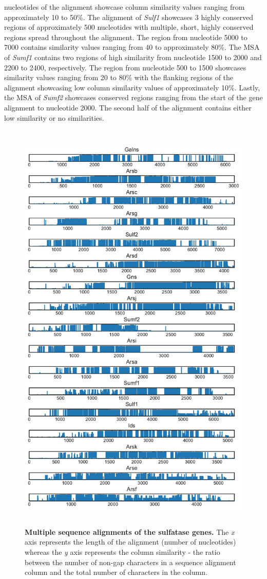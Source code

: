 \documentclass{article}
\begin{document}
nucleotides of the alignment showcase column similarity values ranging from approximately 10 to 50\%. The alignment of \textit{Sulf1} showcases 3 highly conserved regions of approximately 500 nucleotides with multiple, short, highly conserved regions spread throughout the alignment. The region from nucleotide 5000 to 7000 contains similarity values ranging from 40 to approximately 80\%. The MSA of \textit{Sumf1} contains two regions of high similarity from nucleotide 1500 to 2000 and 2200 to 2400, respectively. The region from nucleotide 500 to 1500 showcases similarity values ranging from 20 to 80\% with the flanking regions of the alignment showcasing low column similarity values of approximately 10\%. Lastly, the MSA of \textit{Sumf2} showcases conserved regions ranging from the start of the gene alignment to nucleotide 2000. The second half of the alignment contains either low similarity or no similarities. 

\begin{figure}
\centering
\includegraphics[width=\textwidth,height=8in]{./images/sulfatase_msa.pdf}
\caption{\textbf{Multiple sequence alignments of the sulfatase genes.} The \textit{x} axis represents the length of the alignment (number of nucleotides) whereas the \textit{y} axis represents the column similarity - the ratio between the number of non-gap characters in a sequence alignment column and the total number of characters in the column.}
\label{msa_fig_7}
\end{figure}
\end{document}
